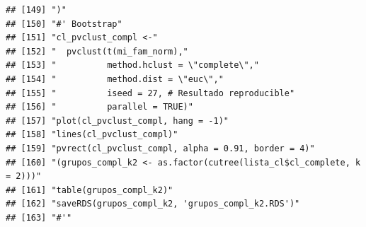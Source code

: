\documentclass[11pt,]{article}
\begin{document}
\begin{verbatim}
## [149] ")"                                                                                                                                                                     
## [150] "#' Bootstrap"                                                                                                                                                          
## [151] "cl_pvclust_compl <-"                                                                                                                                                   
## [152] "  pvclust(t(mi_fam_norm),"                                                                                                                                             
## [153] "          method.hclust = \"complete\","                                                                                                                               
## [154] "          method.dist = \"euc\","                                                                                                                                      
## [155] "          iseed = 27, # Resultado reproducible"                                                                                                                        
## [156] "          parallel = TRUE)"                                                                                                                                            
## [157] "plot(cl_pvclust_compl, hang = -1)"                                                                                                                                     
## [158] "lines(cl_pvclust_compl)"                                                                                                                                               
## [159] "pvrect(cl_pvclust_compl, alpha = 0.91, border = 4)"                                                                                                                    
## [160] "(grupos_compl_k2 <- as.factor(cutree(lista_cl$cl_complete, k = 2)))"                                                                                                   
## [161] "table(grupos_compl_k2)"                                                                                                                                                
## [162] "saveRDS(grupos_compl_k2, 'grupos_compl_k2.RDS')"                                                                                                                       
## [163] "#'"                                                                                                                                                                    

\end{verbatim}
\end{document}
